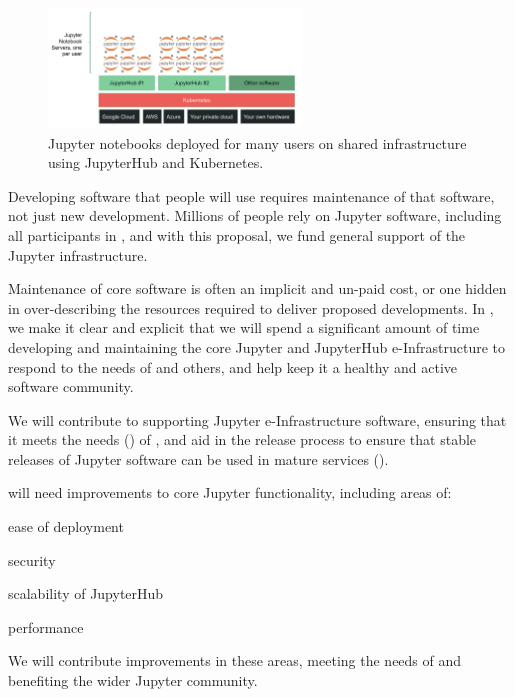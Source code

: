 \begin{task}[
  title=Maintenance of Jupyter and JupyterHub,
  id=maintenance,
  lead=SRL,
  PM=44,
  wphases={0-48},
  partners={XFEL,UPSUD,QS}
]

\begin{figure}[ht!]\centering
  \includegraphics[width=0.6\textwidth]{images/jupyterhub-kube.png}
  \caption{
  Jupyter notebooks deployed for many users
  on shared infrastructure using JupyterHub and Kubernetes.
  }
  \label{fig:jupyterhub-kubernetes}
\end{figure}

  Developing software that people will use requires maintenance of that software,
  not just new development.
  Millions of people rely on Jupyter software,
  including all participants in \TheProject,
  and with this proposal, we fund general support of the Jupyter infrastructure.

  Maintenance of core software is often an implicit and un-paid cost,
  or one hidden in over-describing the resources required to deliver
  proposed developments.
  In \TheProject, we make it clear and explicit that we will spend a significant amount
  of time developing and maintaining the core Jupyter and JupyterHub
  e-Infrastructure to respond to the needs of \TheProject and others,
  and help keep it a healthy and active software community.

  We will contribute to supporting Jupyter e-Infrastructure software,
  ensuring that it meets the needs ()
  of \TheProject,
  and aid in the release process to ensure that stable releases
  of Jupyter software can be used in mature \TheProject services
  ().

  \TheProject will need improvements to core Jupyter functionality, including areas of:

  \begin{compactenum}
    \item ease of deployment
    \item security
    \item scalability of JupyterHub
    \item performance
  \end{compactenum}

  We will contribute improvements in these areas,
  meeting the needs of \TheProject and benefiting the wider Jupyter
  community.

\end{task}
